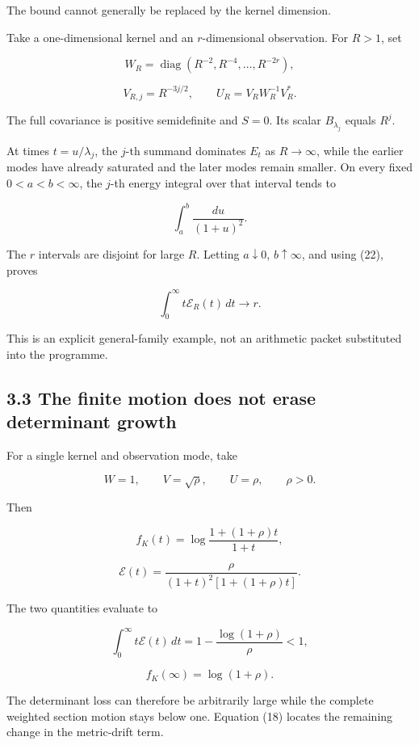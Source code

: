 The bound cannot generally be replaced by the kernel dimension.

Take a one-dimensional kernel and an \(r\)-dimensional observation. For \(R>1\), set

\[
W_R=\operatorname{diag}(R^{-2},R^{-4},\ldots,R^{-2r}),
\]

\[
V_{R,j}=R^{-3j/2},
\qquad
U_R=V_RW_R^{-1}V_R^*.
\]

The full covariance is positive semidefinite and \(S=0\). Its scalar \(B_{\lambda_j}\) equals \(R^j\).

At times \(t=u/\lambda_j\), the \(j\)-th summand dominates \(E_t\) as \(R\to\infty\), while the earlier modes have already saturated and the later modes remain smaller. On every fixed \(0<a<b<\infty\), the \(j\)-th energy integral over that interval tends to

\[
\int_a^b\frac{du}{(1+u)^2}.
\]

The \(r\) intervals are disjoint for large \(R\). Letting \(a\downarrow0\), \(b\uparrow\infty\), and using (22), proves

\[
\boxed{
\int_0^\infty t\mathcal E_R(t)\,dt\longrightarrow r.
}
\tag{25}
\]

This is an explicit general-family example, not an arithmetic packet substituted into the programme.

\subsection{3.3 The finite motion does not erase determinant growth}\label{the-finite-motion-does-not-erase-determinant-growth}

For a single kernel and observation mode, take

\[
W=1,\qquad V=\sqrt\rho,\qquad U=\rho,\qquad \rho>0.
\]

Then

\[
f_K(t)
=
\log\frac{1+(1+\rho)t}{1+t},
\]

\[
\mathcal E(t)
=
\frac{\rho}{(1+t)^2[1+(1+\rho)t]}.
\]

The two quantities evaluate to

\[
\boxed{
\int_0^\infty t\mathcal E(t)\,dt
=
1-\frac{\log(1+\rho)}{\rho}<1,
}
\]

\[
\boxed{f_K(\infty)=\log(1+\rho).}
\tag{26}
\]

The determinant loss can therefore be arbitrarily large while the complete weighted section motion stays below one. Equation (18) locates the remaining change in the metric-drift term.

